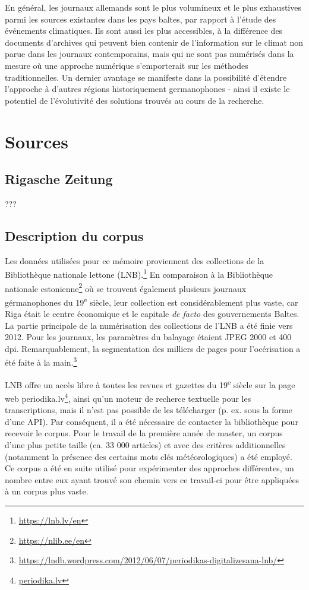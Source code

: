 \documentclass[a4paper,twoside,12pt]{article}
\begin{document}
En général, les journaux allemands sont le plus volumineux et le plus exhaustives parmi les sources existantes dans les pays baltes, par rapport à l'étude des événements climatiques. Ils sont aussi les plus accessibles, à la différence des documents d'archives qui peuvent bien contenir de l'information sur le climat non parue dans les journaux contemporains, mais qui ne sont pas numérisés dans la mesure où une approche numérique s'emporterait sur les méthodes traditionnelles. Un dernier avantage se manifeste dans la possibilité d'étendre l'approche à d'autres régions historiquement germanophones - ainsi il existe le potentiel de l'évolutivité des solutions trouvés au cours de la recherche.

\clearpage




\section{Sources} \label{sources}

\subsection{Rigasche Zeitung}

???

\subsection{Description du corpus} \label{description_corpus}

Les données utilisées pour ce mémoire proviennent des collections de la Bibliothèque nationale lettone (LNB).\footnote{\url{https://lnb.lv/en}} En comparaison à la Bibliothèque nationale estonienne\footnote{\url{https://nlib.ee/en}} où se trouvent également plusieurs journaux gérmanophones du 19\textsuperscript{e} siècle, leur collection est considérablement plus vaste, car Riga était le centre économique et le capitale \textit{de facto} des gouvernements Baltes. La partie principale de la numérisation des collections de l'LNB a été finie vers 2012. Pour les journaux, les paramètres du balayage étaient JPEG 2000 et 400 dpi. Remarquablement, la segmentation des milliers de pages pour l'océrisation a été faite à la main.\footnote{\url{https://lndb.wordpress.com/2012/06/07/periodikas-digitalizesana-lnb/}}

LNB offre un accès libre à toutes les revues et gazettes du 19\textsuperscript{e} siècle sur la page web periodika.lv\footnote{\url{periodika.lv}}, ainsi qu'un moteur de recherce textuelle pour les transcriptions, mais il n'est pas possible de les télécharger (p. ex. sous la forme d'une API). Par conséquent, il a été nécessaire de contacter la bibliothèque pour recevoir le corpus. Pour le travail de la première année de master, un corpus d'une plus petite taille (ca. 33 000 articles) et avec des critères additionnelles (notamment la présence des certains mots clés météorologiques) a été employé. Ce corpus a été en suite utilisé pour expérimenter des approches différentes, un nombre entre eux ayant trouvé son chemin vers ce travail-ci pour être appliquées à un corpus plus vaste.
\end{document}
